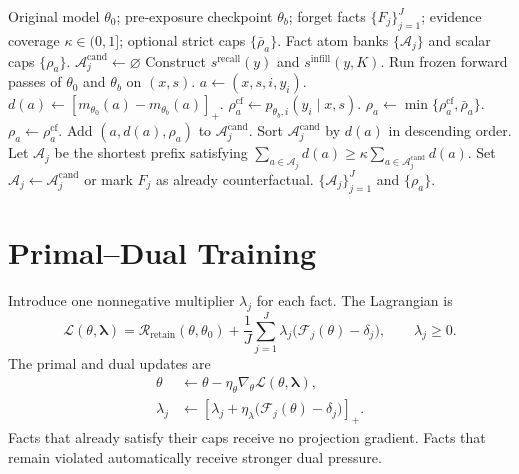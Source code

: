 \documentclass[11pt]{article}
\newcommand{\A}{\mathcal{A}}
\newcommand{\relu}[1]{\left[#1\right]_{+}}
\begin{document}
\begin{algorithm}[t]
\caption{Counterfactual atom-bank and cap construction}
\label{alg:precompute}
\begin{algorithmic}[1]
\Require Original model $\theta_0$; pre-exposure checkpoint $\theta_b$; forget facts $\{F_j\}_{j=1}^{J}$; evidence coverage $\kappa\in(0,1]$; optional strict caps $\{\bar\rho_a\}$.
\Ensure Fact atom banks $\{\A_j\}$ and scalar caps $\{\rho_a\}$.
    \State $\A_j^{\mathrm{cand}}\gets\varnothing$
        \State Construct $s^{\mathrm{recall}}(y)$ and $s^{\mathrm{infill}}(y,K)$.
            \State Run frozen forward passes of $\theta_0$ and $\theta_b$ on $(x,s)$.
                \State $a\gets(x,s,i,y_i)$.
                \State $d(a)\gets\relu{m_{\theta_0}(a)-m_{\theta_b}(a)}$.
                \State $\rho_a^{\mathrm{cf}}\gets p_{\theta_b,i}(y_i\mid x,s)$.
                    \State $\rho_a\gets\min\{\rho_a^{\mathrm{cf}},\bar\rho_a\}$.
                \Else
                    \State $\rho_a\gets\rho_a^{\mathrm{cf}}$.
                \EndIf
                \State Add $(a,d(a),\rho_a)$ to $\A_j^{\mathrm{cand}}$.
            \EndFor
        \EndFor
    \EndFor
    \State Sort $\A_j^{\mathrm{cand}}$ by $d(a)$ in descending order.
    \State Let $\A_j$ be the shortest prefix satisfying
    \Statex \hspace{1.5em}$\displaystyle
        \sum_{a\in\A_j}d(a)
        \geq
        \kappa\sum_{a\in\A_j^{\mathrm{cand}}}d(a)$.
        \State Set $\A_j\gets\A_j^{\mathrm{cand}}$ or mark $F_j$ as already counterfactual.
    \EndIf
\EndFor
\State \Return $\{\A_j\}_{j=1}^{J}$ and $\{\rho_a\}$.
\end{algorithmic}
\end{algorithm}

\section{Primal--Dual Training}

Introduce one nonnegative multiplier $\lambda_j$ for each fact. The Lagrangian is
\begin{equation}
\label{eq:lagrangian}
    \mathcal{L}(\theta,\bm\lambda)
    = \mathcal{R}_{\mathrm{retain}}(\theta,\theta_0)
      + \frac{1}{J}\sum_{j=1}^{J}
        \lambda_j\bigl(\mathcal{F}_j(\theta)-\delta_j\bigr),
    \qquad \lambda_j\geq0.
\end{equation}
The primal and dual updates are
\begin{align}
    \theta
    &\leftarrow
    \theta-
    \eta_{\theta}\nabla_{\theta}
    \mathcal{L}(\theta,\bm\lambda),
    \\
    \lambda_j
    &\leftarrow
    \relu{
        \lambda_j+
        \eta_{\lambda}\bigl(\mathcal{F}_j(\theta)-\delta_j\bigr)
    }.
\end{align}
Facts that already satisfy their caps receive no projection gradient. Facts that remain violated automatically receive stronger dual pressure.
\end{document}
